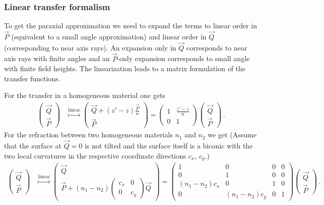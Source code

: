 \documentclass[12pt,a4paper,twoside,openright,BCOR10mm,headsepline,titlepage,abstracton,chapterprefix,final]{scrreprt}
\begin{document}
\subsubsection{Linear transfer formalism}

To get the paraxial approximation we need to expand the terms to linear order in $\vec{P}$ (equivalent to a small angle approximation) and linear order in $\vec{Q}$
(corresponding to near axis rays). An expansion only in $\vec{Q}$ corresponds to near axis rays with finite angles and an $\vec{P}$-only expansion corresponds to
small angle with finite field heights. The linearization leads to a matrix formulation of the transfer functions.

For the transfer in a homogeneous material one gets
\begin{align}
 \begin{pmatrix}
  \vec{Q} \\
  \vec{P}
 \end{pmatrix} &\stackrel{\text{linear}}{\mapsto}
 \begin{pmatrix}
  \vec{Q} + (z' -z) \frac{\vec{P}}{n} \\
  \vec{P}
 \end{pmatrix} =
 \begin{pmatrix}
  1 & \frac{z' - z}{n} \\
  0 & 1
 \end{pmatrix}
 \begin{pmatrix}
  \vec{Q} \\
  \vec{P}
 \end{pmatrix} 
\,.
\end{align}
For the refraction between two homogeneous materials $n_1$ and $n_2$ we get (Assume that the surface at $\vec{Q}=0$ is not tilted and the surface
itself is a biconic with the two local curvatures in the respective coordinate directions $c_x$, $c_y$.)
\begin{align}
 \begin{pmatrix}
  \vec{Q} \\
  \vec{P}
 \end{pmatrix} &\stackrel{\text{linear}}{\mapsto}
 \begin{pmatrix}
  \vec{Q} \\
  \vec{P} + (n_1 - n_2) \begin{pmatrix} c_x & 0 \\ 0 & c_y \end{pmatrix}  \vec{Q}
 \end{pmatrix} =
 \begin{pmatrix}
  1 & 0 & 0 & 0 \\
  0 & 1 & 0 & 0 \\
  (n_1 - n_2)c_x & 0 & 1 & 0   \\
  0 & (n_1 - n_2)c_y & 0 & 1  
 \end{pmatrix}
 \begin{pmatrix}
  \vec{Q} \\
  \vec{P}
 \end{pmatrix} 
\,.
\end{align}
\end{document}
